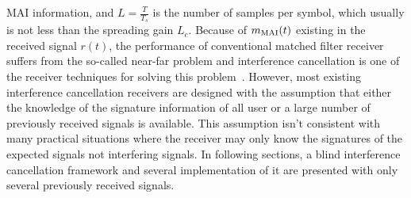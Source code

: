 \documentclass[conference]{IEEEtran}
\begin{document}
MAI information, and $L=\frac{T}{T_s}$ is the number of samples
per symbol, which usually is not less than the spreading gain
$L_c$. Because of $m_{\rm MAI}(t)$ existing in the received signal
$r(t)$, the performance of conventional matched filter receiver
suffers from the so-called near-far problem and interference
cancellation is one of the receiver techniques for solving this
problem~\cite{Verd98}. However, most existing interference
cancellation receivers are designed with the assumption that
either the knowledge of the signature information of all user or a
large number of previously received signals is available. This
assumption isn't consistent with many practical situations where
the receiver may only know the signatures of the expected signals
not interfering signals. In following sections, a blind
interference cancellation framework and several implementation of
it are presented with only several previously received signals.
\end{document}
